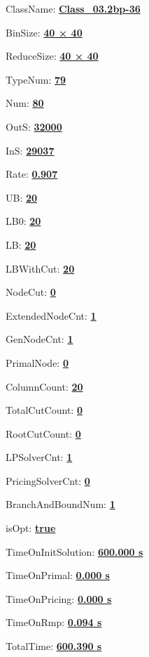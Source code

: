 \documentclass[11pt]{article}
\begin{document}
\pagestyle{empty}


ClassName: \underline{\textbf{Class_03.2bp-36}}
\par
BinSize: \underline{\textbf{40 × 40}}
\par
ReduceSize: \underline{\textbf{40 × 40}}
\par
TypeNum: \underline{\textbf{79}}
\par
Num: \underline{\textbf{80}}
\par
OutS: \underline{\textbf{32000}}
\par
InS: \underline{\textbf{29037}}
\par
Rate: \underline{\textbf{0.907}}
\par
UB: \underline{\textbf{20}}
\par
LB0: \underline{\textbf{20}}
\par
LB: \underline{\textbf{20}}
\par
LBWithCut: \underline{\textbf{20}}
\par
NodeCut: \underline{\textbf{0}}
\par
ExtendedNodeCnt: \underline{\textbf{1}}
\par
GenNodeCnt: \underline{\textbf{1}}
\par
PrimalNode: \underline{\textbf{0}}
\par
ColumnCount: \underline{\textbf{20}}
\par
TotalCutCount: \underline{\textbf{0}}
\par
RootCutCount: \underline{\textbf{0}}
\par
LPSolverCnt: \underline{\textbf{1}}
\par
PricingSolverCnt: \underline{\textbf{0}}
\par
BranchAndBoundNum: \underline{\textbf{1}}
\par
isOpt: \underline{\textbf{true}}
\par
TimeOnInitSolution: \underline{\textbf{600.000 s}}
\par
TimeOnPrimal: \underline{\textbf{0.000 s}}
\par
TimeOnPricing: \underline{\textbf{0.000 s}}
\par
TimeOnRmp: \underline{\textbf{0.094 s}}
\par
TotalTime: \underline{\textbf{600.390 s}}
\par
\newpage


\end{document}

